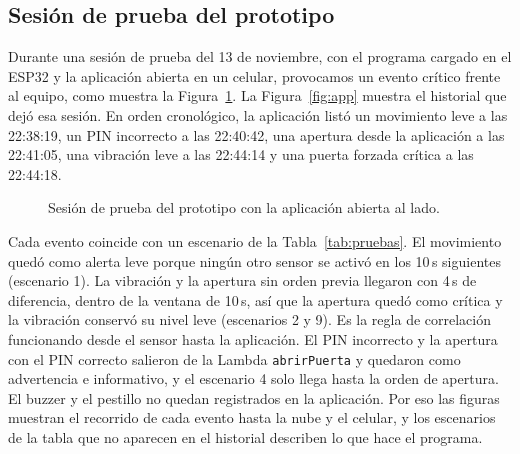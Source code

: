 \documentclass[manuscript,screen,nonacm]{acmart}
\begin{document}
\subsection{Sesión de prueba del prototipo}
Durante una sesión de prueba del 13 de noviembre, con el programa cargado en el ESP32 y la aplicación abierta en un celular, provocamos un evento crítico frente al equipo, como muestra la Figura~\ref{fig:prueba}. La Figura~\ref{fig:app} muestra el historial que dejó esa sesión. En orden cronológico, la aplicación listó un movimiento leve a las 22:38:19, un PIN incorrecto a las 22:40:42, una apertura desde la aplicación a las 22:41:05, una vibración leve a las 22:44:14 y una puerta forzada crítica a las 22:44:18.

\begin{figure}[htbp]
\centering
{}
\caption{Sesión de prueba del prototipo con la aplicación abierta al lado.}
\label{fig:prueba}
\end{figure}

Cada evento coincide con un escenario de la Tabla~\ref{tab:pruebas}. El movimiento quedó como alerta leve porque ningún otro sensor se activó en los 10\,s siguientes (escenario 1). La vibración y la apertura sin orden previa llegaron con 4\,s de diferencia, dentro de la ventana de 10\,s, así que la apertura quedó como crítica y la vibración conservó su nivel leve (escenarios 2 y 9). Es la regla de correlación funcionando desde el sensor hasta la aplicación. El PIN incorrecto y la apertura con el PIN correcto salieron de la Lambda \texttt{abrirPuerta} y quedaron como advertencia e informativo, y el escenario 4 solo llega hasta la orden de apertura. El buzzer y el pestillo no quedan registrados en la aplicación. Por eso las figuras muestran el recorrido de cada evento hasta la nube y el celular, y los escenarios de la tabla que no aparecen en el historial describen lo que hace el programa.
\end{document}
